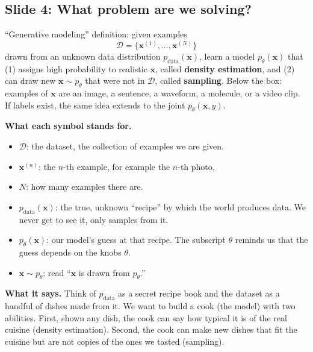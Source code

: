 \subsection*{Slide 4: What problem are we solving?}

``Generative modeling'' definition: given examples
\[
\mathcal{D}=\{\mathbf{x}^{(1)},\dots,\mathbf{x}^{(N)}\}
\]
drawn from an unknown data distribution $p_{\text{data}}(\mathbf{x})$, learn a model $p_\theta(\mathbf{x})$ that (1) assigns high probability to realistic $\mathbf{x}$, called \textbf{density estimation}, and (2) can draw new $\mathbf{x}\sim p_\theta$ that were not in $\mathcal{D}$, called \textbf{sampling}. Below the box: examples of $\mathbf{x}$ are an image, a sentence, a waveform, a molecule, or a video clip. If labels exist, the same idea extends to the joint $p_\theta(\mathbf{x},y)$.

\textbf{What each symbol stands for.}
\begin{itemize}
\item $\mathcal{D}$: the dataset, the collection of examples we are given.
\item $\mathbf{x}^{(n)}$: the $n$-th example, for example the $n$-th photo.
\item $N$: how many examples there are.
\item $p_{\text{data}}(\mathbf{x})$: the true, unknown ``recipe'' by which the world produces data. We never get to see it, only samples from it.
\item $p_\theta(\mathbf{x})$: our model's guess at that recipe. The subscript $\theta$ reminds us that the guess depends on the knobs $\theta$.
\item $\mathbf{x}\sim p_\theta$: read ``$\mathbf{x}$ is drawn from $p_\theta$.''
\end{itemize}

\textbf{What it says.} Think of $p_{\text{data}}$ as a secret recipe book and the dataset as a handful of dishes made from it. We want to build a cook (the model) with two abilities. First, shown any dish, the cook can say how typical it is of the real cuisine (density estimation). Second, the cook can make new dishes that fit the cuisine but are not copies of the ones we tasted (sampling).

